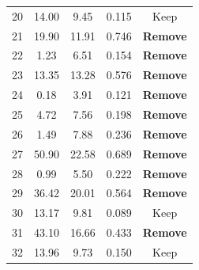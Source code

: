 \begin{center}
\begin{longtable}{@{}ccccc@{}}
20 & 14.00 & 9.45 & 0.115 & Keep\\
21 & 19.90 & 11.91 & 0.746 & \textcolor{accent}{\textbf{Remove}}\\
22 & 1.23 & 6.51 & 0.154 & \textcolor{accent}{\textbf{Remove}}\\
23 & 13.35 & 13.28 & 0.576 & \textcolor{accent}{\textbf{Remove}}\\
24 & 0.18 & 3.91 & 0.121 & \textcolor{accent}{\textbf{Remove}}\\
25 & 4.72 & 7.56 & 0.198 & \textcolor{accent}{\textbf{Remove}}\\
26 & 1.49 & 7.88 & 0.236 & \textcolor{accent}{\textbf{Remove}}\\
27 & 50.90 & 22.58 & 0.689 & \textcolor{accent}{\textbf{Remove}}\\
28 & 0.99 & 5.50 & 0.222 & \textcolor{accent}{\textbf{Remove}}\\
29 & 36.42 & 20.01 & 0.564 & \textcolor{accent}{\textbf{Remove}}\\
30 & 13.17 & 9.81 & 0.089 & Keep\\
31 & 43.10 & 16.66 & 0.433 & \textcolor{accent}{\textbf{Remove}}\\
32 & 13.96 & 9.73 & 0.150 & Keep\\
\bottomrule
\end{longtable}
\end{center}
